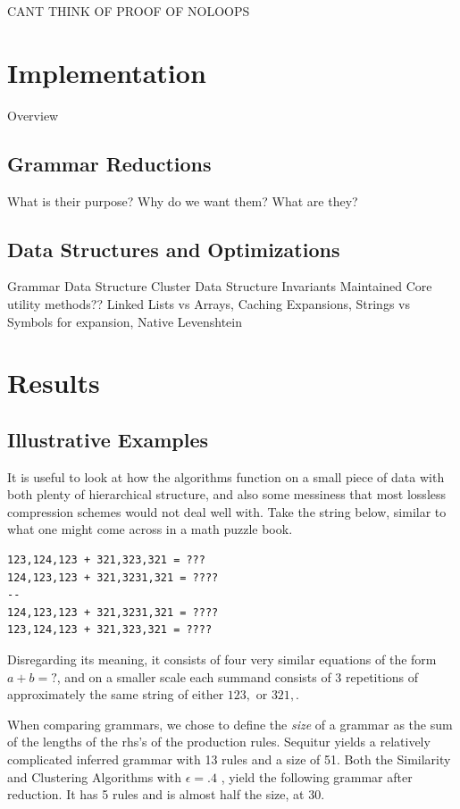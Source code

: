 \documentclass[11pt]{article}
\begin{document}
CANT THINK OF PROOF OF NOLOOPS

\section{Implementation}
Overview

\subsection{Grammar Reductions}
What is their purpose? Why do we want them? What are they?

\subsection{Data Structures and Optimizations}
Grammar Data Structure
Cluster Data Structure
Invariants Maintained
Core utility methods??
Linked Lists vs Arrays, Caching Expansions, Strings vs Symbols for expansion, Native Levenshtein

\section{Results}
\subsection{Illustrative Examples}
It is useful to look at how the algorithms function on a small piece of
data with both plenty of hierarchical structure, and also some messiness
that most lossless compression schemes would not deal well with. Take
the string below, similar to what one might come across in a math
puzzle book.

\begin{verbatim}
123,124,123 + 321,323,321 = ???
124,123,123 + 321,3231,321 = ????
--
124,123,123 + 321,3231,321 = ????
123,124,123 + 321,323,321 = ????
\end{verbatim}

Disregarding its meaning, it consists of four very similar equations of the
form $a + b = ?$, and on a smaller scale each summand consists of
3 repetitions of approximately the same string of either $123,$ or $321,$.

When comparing grammars, we chose to define the \emph{size} of a grammar
as the sum of the lengths of the rhs's of the production rules.
Sequitur yields a relatively complicated inferred grammar with 13 rules and
a size of 51. Both the Similarity and Clustering Algorithms with $\epsilon = .4$
, yield the following grammar after reduction. It has 5 rules and is almost
half the size, at 30.
\end{document}
